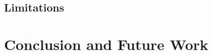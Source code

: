 \documentclass[12pt, letterpaper]{article}
\begin{document}
\subsection{Limitations}


\section{Conclusion and Future Work}


\newpage


\end{document}
